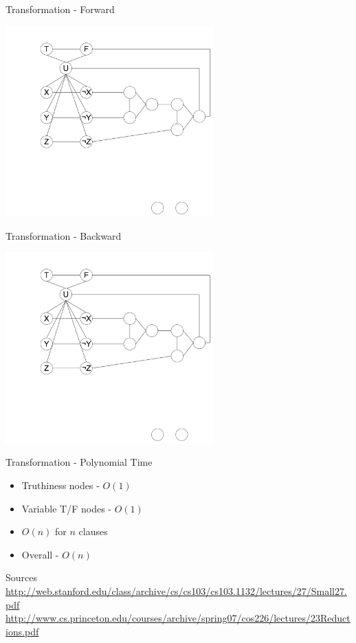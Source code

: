 \documentclass[bigger]{beamer}
\begin{document}
\begin{frame}[label=sec-17]{Transformation - Forward}
\begin{center}
\includegraphics[width=8cm]{Comb2.png}
\end{center}
\end{frame}

\begin{frame}[label=sec-18]{Transformation - Backward}
\begin{center}
\includegraphics[width=8cm]{Comb2.png}
\end{center}
\end{frame}

\begin{frame}[label=sec-19]{Transformation - Polynomial Time}
\begin{itemize}
\item<1-> Truthiness nodes - \(O(1)\)
\item<2-> Variable T/F nodes - \(O(1)\)
\item<3-> \(O(n)\) for \(n\) clauses
\item<4-> Overall - \(O(n)\)
\end{itemize}
\end{frame}

\begin{frame}[label=sec-20]{Sources}
\url{http://web.stanford.edu/class/archive/cs/cs103/cs103.1132/lectures/27/Small27.pdf}
\url{http://www.cs.princeton.edu/courses/archive/spring07/cos226/lectures/23Reductions.pdf}
\end{frame}
\end{document}
